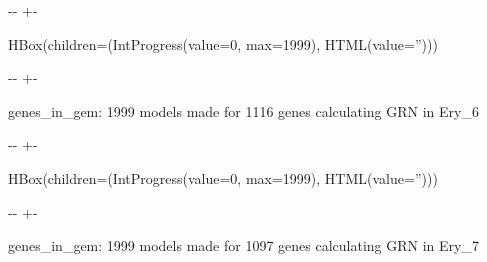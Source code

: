 \documentclass[letterpaper,10pt,english]{sphinxmanual}
\newlength\nbsphinxcodecellspacing
\begin{document}
{

\kern-\sphinxverbatimsmallskipamount\kern-\baselineskip
\kern+\FrameHeightAdjust\kern-\fboxrule
\vspace{\nbsphinxcodecellspacing}

\begin{sphinxVerbatim}[commandchars=\\\{\}]
HBox(children=(IntProgress(value=0, max=1999), HTML(value='')))
\end{sphinxVerbatim}
}

{

\kern-\sphinxverbatimsmallskipamount\kern-\baselineskip
\kern+\FrameHeightAdjust\kern-\fboxrule
\vspace{\nbsphinxcodecellspacing}

\begin{sphinxVerbatim}[commandchars=\\\{\}]

genes\_in\_gem: 1999
models made for 1116 genes
calculating GRN in Ery\_6
\end{sphinxVerbatim}
}

{

\kern-\sphinxverbatimsmallskipamount\kern-\baselineskip
\kern+\FrameHeightAdjust\kern-\fboxrule
\vspace{\nbsphinxcodecellspacing}

\begin{sphinxVerbatim}[commandchars=\\\{\}]
HBox(children=(IntProgress(value=0, max=1999), HTML(value='')))
\end{sphinxVerbatim}
}

{

\kern-\sphinxverbatimsmallskipamount\kern-\baselineskip
\kern+\FrameHeightAdjust\kern-\fboxrule
\vspace{\nbsphinxcodecellspacing}

\begin{sphinxVerbatim}[commandchars=\\\{\}]

genes\_in\_gem: 1999
models made for 1097 genes
calculating GRN in Ery\_7
\end{sphinxVerbatim}
}
\end{document}
